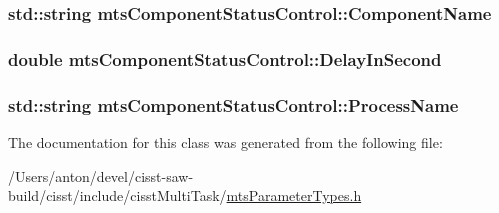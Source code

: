 \subsubsection[{Component\+Name}]{\setlength{\rightskip}{0pt plus 5cm}std\+::string mts\+Component\+Status\+Control\+::\+Component\+Name}\label{classmts_component_status_control_a10e6f2dd9746957babad7a0ca081bf9c}
\hypertarget{classmts_component_status_control_a91669bce299eebde1907da850c138c01}{}
\subsubsection[{Delay\+In\+Second}]{\setlength{\rightskip}{0pt plus 5cm}double mts\+Component\+Status\+Control\+::\+Delay\+In\+Second}\label{classmts_component_status_control_a91669bce299eebde1907da850c138c01}
\hypertarget{classmts_component_status_control_af79c985b9f9820b1a8faabf58a0abf47}{}
\subsubsection[{Process\+Name}]{\setlength{\rightskip}{0pt plus 5cm}std\+::string mts\+Component\+Status\+Control\+::\+Process\+Name}\label{classmts_component_status_control_af79c985b9f9820b1a8faabf58a0abf47}


The documentation for this class was generated from the following file\+:\begin{DoxyCompactItemize}
\item 
/\+Users/anton/devel/cisst-\/saw-\/build/cisst/include/cisst\+Multi\+Task/\hyperlink{mts_parameter_types_8h}{mts\+Parameter\+Types.\+h}\end{DoxyCompactItemize}
